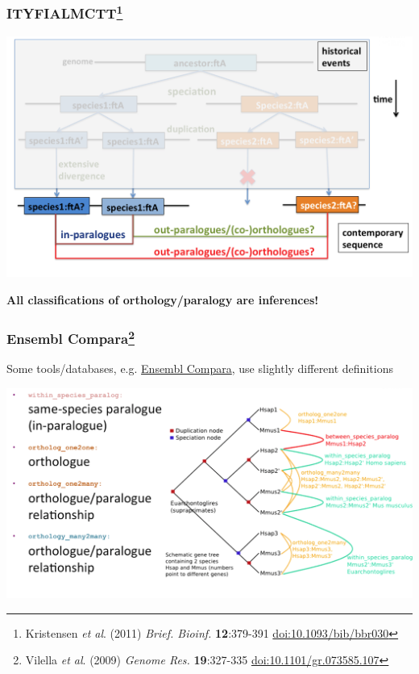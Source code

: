 \begin{frame}
  \frametitle{ITYFIALMCTT\footnote{\tiny{Kristensen \textit{et al}. (2011) \textit{Brief. Bioinf.} \textbf{12}:379-391 \href{http://dx.doi.org/10.1093/bib/bbr030}{doi:10.1093/bib/bbr030}}}}
  \begin{center}
    \includegraphics[width=1\textwidth]{images/logues6}  
  \end{center} 
  \textbf{All classifications of orthology/paralogy are inferences!}
\end{frame}

\begin{frame}
  \frametitle{Ensembl Compara\footnote{\tiny{Vilella \textit{et al}. (2009) \textit{Genome Res.} \textbf{19}:327-335 \href{http://dx.doi.org/10.1101/gr.073585.107}{doi:10.1101/gr.073585.107}}}}
  Some tools/databases, e.g. \href{http://www.ensembl.org/info/genome/compara/index.html}{Ensembl Compara}, use slightly different definitions
  \begin{center}
    \includegraphics[width=1\textwidth]{images/logues7}  
  \end{center} 
\end{frame}